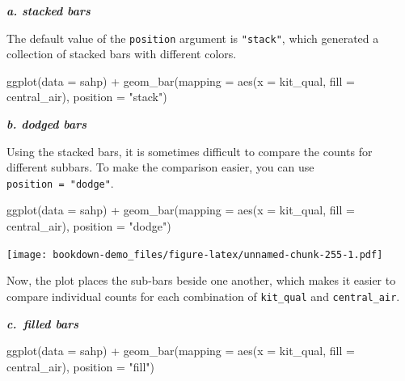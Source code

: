 \documentclass[
]{book}
\newenvironment{Shaded}{\begin{snugshade}}{\end{snugshade}}
\newcommand{\AttributeTok}[1]{\textcolor[rgb]{0.77,0.63,0.00}{#1}}
\newcommand{\FunctionTok}[1]{\textcolor[rgb]{0.00,0.00,0.00}{#1}}
\newcommand{\NormalTok}[1]{#1}
\newcommand{\SpecialCharTok}[1]{\textcolor[rgb]{0.00,0.00,0.00}{#1}}
\newcommand{\StringTok}[1]{\textcolor[rgb]{0.31,0.60,0.02}{#1}}
\begin{document}
\textbf{\emph{a. stacked bars}}

The default value of the \texttt{position} argument is \texttt{"stack"}, which generated a collection of stacked bars with different colors.

\begin{Shaded}
\begin{Highlighting}[]
\FunctionTok{ggplot}\NormalTok{(}\AttributeTok{data =}\NormalTok{ sahp) }\SpecialCharTok{+} \FunctionTok{geom\_bar}\NormalTok{(}\AttributeTok{mapping =} \FunctionTok{aes}\NormalTok{(}\AttributeTok{x =}\NormalTok{ kit\_qual, }\AttributeTok{fill =}\NormalTok{ central\_air), }\AttributeTok{position =} \StringTok{"stack"}\NormalTok{)}
\end{Highlighting}
\end{Shaded}

\textbf{\emph{b. dodged bars}}

Using the stacked bars, it is sometimes difficult to compare the counts for different subbars. To make the comparison easier, you can use \texttt{position\ =\ "dodge"}.

\begin{Shaded}
\begin{Highlighting}[]
\FunctionTok{ggplot}\NormalTok{(}\AttributeTok{data =}\NormalTok{ sahp) }\SpecialCharTok{+} \FunctionTok{geom\_bar}\NormalTok{(}\AttributeTok{mapping =} \FunctionTok{aes}\NormalTok{(}\AttributeTok{x =}\NormalTok{ kit\_qual, }\AttributeTok{fill =}\NormalTok{ central\_air), }\AttributeTok{position =} \StringTok{"dodge"}\NormalTok{)}
\end{Highlighting}
\end{Shaded}

\texttt{[image: bookdown-demo\_files/figure-latex/unnamed-chunk-255-1.pdf]}

Now, the plot places the sub-bars beside one another, which makes it easier to compare individual counts for each combination of \texttt{kit\_qual} and \texttt{central\_air}.

\textbf{\emph{c.~filled bars}}

\begin{Shaded}
\begin{Highlighting}[]
\FunctionTok{ggplot}\NormalTok{(}\AttributeTok{data =}\NormalTok{ sahp) }\SpecialCharTok{+} \FunctionTok{geom\_bar}\NormalTok{(}\AttributeTok{mapping =} \FunctionTok{aes}\NormalTok{(}\AttributeTok{x =}\NormalTok{ kit\_qual, }\AttributeTok{fill =}\NormalTok{ central\_air), }\AttributeTok{position =} \StringTok{"fill"}\NormalTok{)}
\end{Highlighting}
\end{Shaded}
\end{document}
